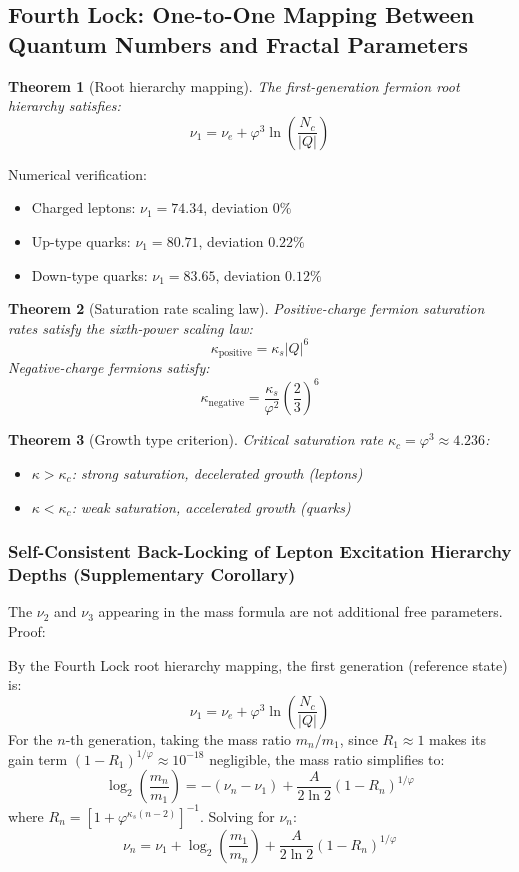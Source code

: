 \documentclass[12pt,a4paper,twocolumn]{article}
\renewcommand{\phi}{\varphi}
\newtheorem{theorem}{Theorem}[section]
\begin{document}
\subsection{Fourth Lock: One-to-One Mapping Between Quantum Numbers and Fractal Parameters}
\begin{theorem}[Root hierarchy mapping]
The first-generation fermion root hierarchy satisfies:
\[
\nu_1 = \nu_e + \phi^3 \ln\left(\frac{N_c}{|Q|}\right)
\]
\end{theorem}

Numerical verification:
\begin{itemize}
\item Charged leptons: $\nu_1 = 74.34$, deviation $0\%$
\item Up-type quarks: $\nu_1 = 80.71$, deviation $0.22\%$
\item Down-type quarks: $\nu_1 = 83.65$, deviation $0.12\%$
\end{itemize}

\begin{theorem}[Saturation rate scaling law]
Positive-charge fermion saturation rates satisfy the sixth-power scaling law:
\[
\kappa_{\text{positive}} = \kappa_s |Q|^6
\]
Negative-charge fermions satisfy:
\[
\kappa_{\text{negative}} = \frac{\kappa_s}{\phi^2}\left(\frac{2}{3}\right)^6
\]
\end{theorem}

\begin{theorem}[Growth type criterion]
Critical saturation rate $\kappa_c = \phi^3 \approx 4.236$:
\begin{itemize}
\item $\kappa > \kappa_c$: strong saturation, decelerated growth (leptons)
\item $\kappa < \kappa_c$: weak saturation, accelerated growth (quarks)
\end{itemize}
\end{theorem}

\subsubsection{Self-Consistent Back-Locking of Lepton Excitation Hierarchy Depths (Supplementary Corollary)}
\label{subsec:nu_generation}

The $\nu_2$ and $\nu_3$ appearing in the mass formula are not additional free parameters. Proof:

By the Fourth Lock root hierarchy mapping, the first generation (reference state) is:
\[
\nu_1 = \nu_e + \phi^3 \ln\left(\frac{N_c}{|Q|}\right)
\]
For the $n$-th generation, taking the mass ratio $m_n/m_1$, since $R_1 \approx 1$ makes its gain term $(1-R_1)^{1/\phi} \approx 10^{-18}$ negligible, the mass ratio simplifies to:
\[
\log_2\left(\frac{m_n}{m_1}\right) = -(\nu_n - \nu_1) + \frac{A}{2\ln 2}(1-R_n)^{1/\phi}
\]
where $R_n = [1 + \phi^{\kappa_s(n-2)}]^{-1}$. Solving for $\nu_n$:
\[
\nu_n = \nu_1 + \log_2\left(\frac{m_1}{m_n}\right) + \frac{A}{2\ln 2}(1-R_n)^{1/\phi}
\]
\end{document}

